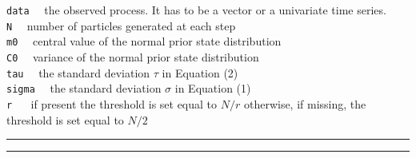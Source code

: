 \documentclass[
]{book}
\theoremstyle{break}
\theoremstyle{nonumberplain}
\begin{document}
\texttt{data} ~~the observed process. It has to be a vector or a
univariate time series.\\
\texttt{N} ~~number of particles generated at each step\\
\texttt{m0} ~~central value of the normal prior state distribution\\
\texttt{C0} ~~variance of the normal prior state distribution\\
\texttt{tau} ~~the standard deviation \(\tau\) in Equation (2)\\
\texttt{sigma} ~~the standard deviation \(\sigma\) in Equation (1)\\
\texttt{r} ~~ if present the threshold is set equal to \(N/r\)
otherwise, if missing, the threshold is set equal to \(N/2\)

\hrule
\hrule
\end{document}
